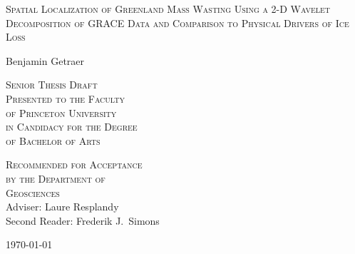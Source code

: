 \thispagestyle{empty}
  \begin{center}
    \textsc{\LARGE Spatial Localization of Greenland Mass Wasting Using a 2-D Wavelet Decomposition of GRACE Data and Comparison to Physical Drivers of Ice Loss} 
  \end{center}
  \vspace{.6in}
  \begin{center}
    Benjamin Getraer 
  \end{center}
  \vspace{.6in}
  \begin{center}
    \textsc{Senior Thesis Draft \\ 
    Presented to the Faculty \\
    of Princeton University \\
    in Candidacy for the Degree \\
    of Bachelor of Arts}
  \end{center}
  \vspace{.3in}
  \begin{center}
    \textsc{Recommended for Acceptance \\
    by the Department of \\
    Geosciences \\}
    Adviser: Laure Resplandy \\
    Second Reader: Frederik J.~Simons \\
  \end{center}
  \vspace{.3in}
  \begin{center}
\today
  \end{center}
  
  \clearpage